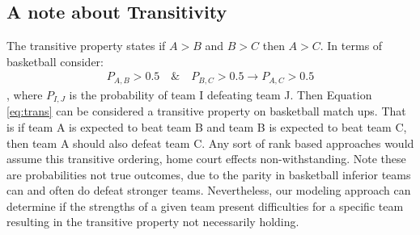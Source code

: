 \subsection{A note about Transitivity}
The transitive property states if $A>B$ and $B>C$ then $A>C$.   In terms of basketball consider:
\begin{eqnarray}
P_{A,B} > 0.5 \quad \& \quad P_{B,C} > 0.5 \rightarrow P_{A,C} > 0.5
\label{eq:trans}
\end{eqnarray}
, where $P_{I,J}$ is the probability of team I defeating team J.  Then Equation \ref{eq:trans} can be considered a transitive property on basketball match ups.  That is if team A is expected to beat team B and team B is expected to beat team C, then team A should also defeat team C.  Any sort of rank based approaches would assume this transitive ordering, home court effects non-withstanding.  Note these are probabilities not true outcomes, due to the parity in basketball inferior teams can and often do defeat stronger teams.  Nevertheless, our modeling approach can determine if the strengths of a given team present difficulties for a specific team resulting in the transitive property not necessarily holding.
